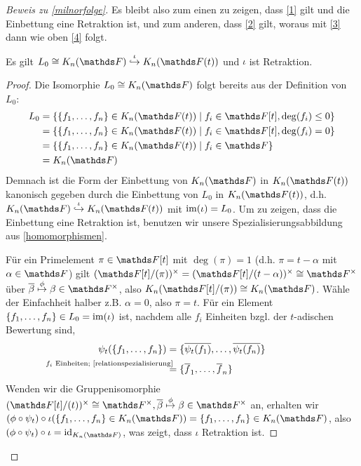 \documentclass[ngerman,fontsize=11pt, paper=a4, parskip=half, titlepage=true, toc=bib]{scrartcl}
\begin{document}
\begin{proof}[Beweis zu \ref{milnorfolge}]
  Es bleibt also zum einen zu zeigen, dass \ref{1} gilt und die Einbettung eine
  Retraktion ist, und zum anderen, dass \ref{2} gilt, woraus mit \ref{3} dann wie
  oben \ref{4} folgt.
  
  \begin{Lem}
    Es gilt $L_0\cong \KnF\overset{\iota}{\hookrightarrow} \KnFt$
    und $\iota$ ist Retraktion.
    \begin{proof}
      Die Isomorphie $L_0\cong\KnF$ folgt bereits aus der Definition
      von $L_0$:
      \begin{align*}
        L_0
        &=\left\{\{f_1,\dotsc,f_n\}\in\KnFt 
          \mid f_i\in\F[t], \deg(f_i)\leq 0\right\}\\
        &=\left\{\{f_1,\dotsc,f_n\}\in\KnFt 
          \mid f_i\in\F[t], \deg(f_i)= 0\right\}\\
        &=\left\{\{f_1,\dotsc,f_n\}\in\KnFt 
          \mid f_i\in\F\right\}\\
        &=\KnF
      \end{align*}
      Demnach ist die Form der Einbettung von $\KnF$ in $\KnFt$
      kanonisch gegeben durch die Einbettung von $L_0$ in $\KnFt$, 
      d.h. $\KnF\overset{\iota}{\hookrightarrow}\KnFt$ mit $\operatorname{im}(\iota)=L_0$.
      Um zu zeigen, dass die Einbettung eine Retraktion ist,
      benutzen wir unsere Spezialisierungsabbildung aus 
      \ref{homomorphismen}.
      
      Für ein Primelement $\pi\in\F[t]$ mit $\deg(\pi)=1$
      (d.h. $\pi=t-\alpha$ mit $\alpha\in\F$)
      gilt $(\Ftpi)^\times=(\F[t]/(t-\alpha))^\times\cong \Fx$ 
      über $\ov{\beta}\overset{\phi}{\mapsto} \beta\in\Fx$, 
      also $\KnFtpi\cong\KnF$.
      Wähle der Einfachheit halber z.B. $\alpha=0$, also $\pi=t$.
      Für ein Element $\{f_1,\dotsc, f_n\}\in L_0=\operatorname{im}(\iota)$ ist,
      nachdem alle $f_i$ Einheiten bzgl. der $t$-adischen Bewertung sind,
      \begin{align*}
        \psi_t(\{f_1,\dotsc,f_n\})
        &=\{\ov{\psi_t(f_1)},\dotsc, \ov{\psi_t(f_n)}\}\\
        &\overset{\mathllap{\text{$f_i$ Einheiten; 
          \ref{relationspezialisierung}}}}{=}
          \{\ov f_1,\dotsc, \ov f_n\}
      \end{align*}
      Wenden wir die Gruppenisomorphie $(\F[t]/(t))^\times\cong\Fx,
      \ov\beta\overset{\phi}{\mapsto}\beta\in\Fx$ an, erhalten wir
      $(\phi\circ\psi_t)\circ \iota(\{f_1,\dotsc,f_n\}\in\KnF)
      =\{f_1,\dotsc,f_n\}\in\KnF$,
      also $(\phi\circ\psi_t)\circ \iota=\id_{\KnF}$, was zeigt, dass
      $\iota$ Retraktion ist.
    \end{proof}
  \end{Lem}
  

\end{proof}
\end{document}
